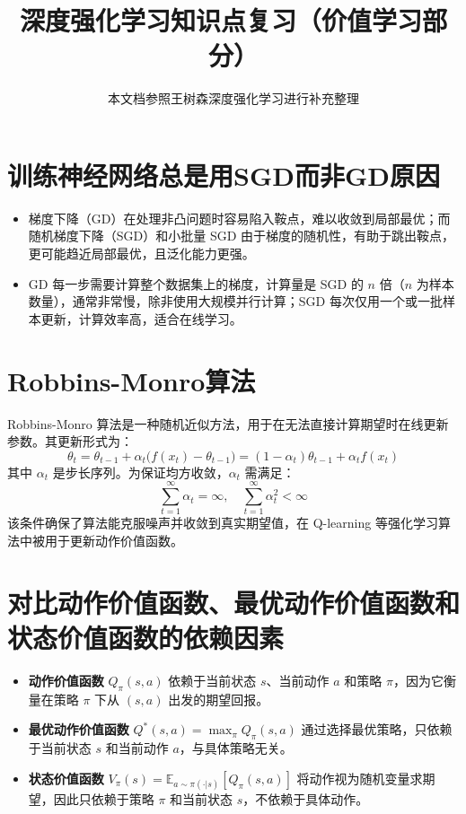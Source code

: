 \documentclass{article}
\title{深度强化学习知识点复习（价值学习部分）}
\author{本文档参照王树森深度强化学习进行补充整理}
\begin{document}
\maketitle

\section{训练神经网络总是用SGD而非GD原因}
\begin{itemize}
    \item 梯度下降（GD）在处理非凸问题时容易陷入鞍点，难以收敛到局部最优；而随机梯度下降（SGD）和小批量 SGD 由于梯度的随机性，有助于跳出鞍点，更可能趋近局部最优，且泛化能力更强。
    \item GD 每一步需要计算整个数据集上的梯度，计算量是 SGD 的 \(n\) 倍（\(n\) 为样本数量），通常非常慢，除非使用大规模并行计算；SGD 每次仅用一个或一批样本更新，计算效率高，适合在线学习。
\end{itemize}

\section{Robbins-Monro算法}
Robbins-Monro 算法是一种随机近似方法，用于在无法直接计算期望时在线更新参数。其更新形式为：
\[
\theta_t = \theta_{t-1} + \alpha_t \bigl( f(x_t) - \theta_{t-1} \bigr) = (1 - \alpha_t) \theta_{t-1} + \alpha_t  f(x_t) \tag{1}
\]
其中 \(\alpha_t\) 是步长序列。为保证均方收敛，\(\alpha_t\) 需满足：
\[
\sum_{t=1}^{\infty} \alpha_t = \infty, \quad \sum_{t=1}^{\infty} \alpha_t^2 < \infty \tag{2}
\]
该条件确保了算法能克服噪声并收敛到真实期望值，在 Q-learning 等强化学习算法中被用于更新动作价值函数。

\section{对比动作价值函数、最优动作价值函数和状态价值函数的依赖因素}
\begin{itemize}
    \item \textbf{动作价值函数} \(Q_\pi(s,a)\) 依赖于当前状态 \(s\)、当前动作 \(a\) 和策略 \(\pi\)，因为它衡量在策略 \(\pi\) 下从 \((s,a)\) 出发的期望回报。
    \item \textbf{最优动作价值函数} \(Q^*(s,a) = \max_\pi Q_\pi(s,a)\) 通过选择最优策略，只依赖于当前状态 \(s\) 和当前动作 \(a\)，与具体策略无关。
    \item \textbf{状态价值函数} \(V_\pi(s) = \mathbb{E}_{a\sim\pi(\cdot|s)}[Q_\pi(s,a)]\) 将动作视为随机变量求期望，因此只依赖于策略 \(\pi\) 和当前状态 \(s\)，不依赖于具体动作。
\end{itemize}
\end{document}
